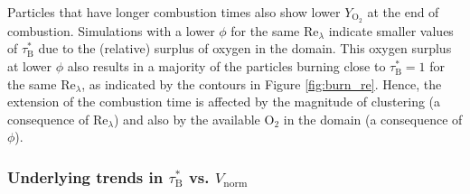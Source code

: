 \documentclass[times,twocolumn,final]{elsarticle}
\newcommand{\mrm}[1]{\mathrm{#1}}
\newcommand{\Rel}{\mathrm{Re}_\lambda}
\newcommand{\YO}{Y_\mathrm{O_2}}
\newcommand{\taub}{\tau_\mathrm{B}}
\begin{document}
Particles that have longer combustion times also show lower $\YO$ at the end of combustion. Simulations with a lower $\phi$ for the same $\Rel$ indicate smaller values of $\taub^*$ due to the (relative) surplus of oxygen in the domain. This oxygen surplus at lower $\phi$ also results in a majority of the particles burning close to $\taub^*=1$ for the same $\Rel$, as indicated by the contours in Figure \ref{fig:burn_re}. Hence, the extension of the combustion time is affected by the magnitude of clustering (a consequence of $\Rel$) and also by the available $\mathrm{O_2}$ in the domain (a consequence of $\phi$). 

\subsubsection{Underlying trends in $\taub^*$ vs. $V_\mrm{norm}$}

\end{document}
